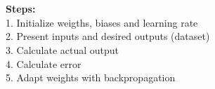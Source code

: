 \documentclass{article}
\begin{document}
    \section{}
    \begin{flushleft}


\large {
\textbf{Steps:}\\
\vspace{0.5cm}
1. Initialize weigths, biases and learning rate\\
2. Present inputs and desired outputs (dataset)\\
3. Calculate actual output\\
4. Calculate error\\
5. Adapt weights with backpropagation\\}
\end{flushleft}

    	 
    \vspace{0.5cm}
    

    \section{}
\end{document}
